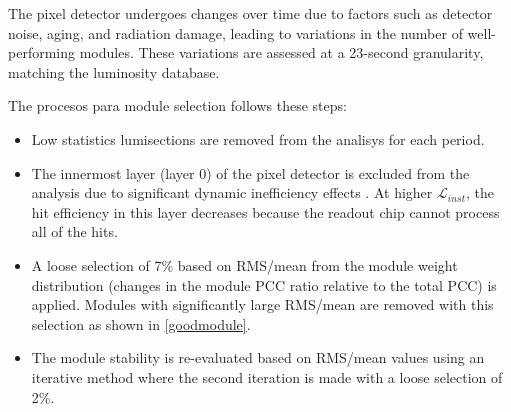 The pixel detector undergoes changes over time due to factors such as detector noise, aging, and radiation damage, leading to variations in the number of well-performing modules. These variations are assessed at a 23-second granularity, matching the luminosity database.

The procesos para module selection follows these steps:

\begin{itemize}
\item Low statistics lumisections are removed from the analisys for each period.
\item The innermost layer (layer 0) of the pixel detector is excluded from the analysis due to significant dynamic inefficiency effects \cite{pas_18}. At higher $\mathcal{L}_{inst}$, the hit efficiency in this layer decreases because the readout chip cannot process all of the hits.
\item A loose selection of 7\% based on RMS/mean from the module weight distribution (changes in the module PCC ratio relative to the total PCC) is applied. Modules with significantly large RMS/mean are removed with this selection as shown in \ref{goodmodule}.
\item The module stability is re-evaluated based on RMS/mean values using an iterative method where the second iteration is made with a loose selection of 2\%.
\end{itemize}


